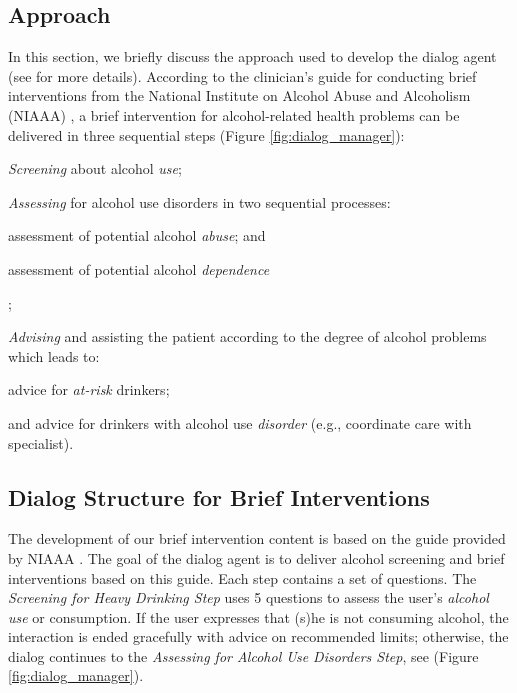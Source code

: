 \documentclass[letterpaper]{article}
\begin{document}
\begin{sloppy}
\section{Approach}

In this section, we briefly discuss the approach used to develop the dialog 
agent (see \cite{YASCLL14} for more details). According to the 
clinician's guide for conducting brief interventions from the National Institute on Alcohol Abuse 
and Alcoholism (NIAAA) \cite{national2007helping}, a brief intervention for alcohol-related health 
problems can be delivered in three sequential steps (Figure 
\ref{fig:dialog_manager}): 
\begin{inparaenum}[1)] 
\item {\em Screening} about alcohol {\em use}; 
\item {\em Assessing} for alcohol use disorders in two sequential processes: 
  \begin{inparaenum}[a)] 
    \item assessment of potential alcohol {\em abuse}; and 
    \item assessment  of potential alcohol {\em dependence}
  \end{inparaenum}; 
\item {\em Advising} and assisting the patient according to the degree of alcohol problems which leads to: 
  \begin{inparaenum} 
    \item advice for {\em at-risk} drinkers; 
    \item and advice for drinkers with alcohol use {\em disorder} (e.g., coordinate care with 
specialist).
  \end{inparaenum} 
\end{inparaenum}

\subsection{Dialog Structure for Brief Interventions}

The development of our brief intervention content is based on the guide provided by 
NIAAA \cite{national2006niaaa}. The goal of the dialog agent is to deliver alcohol screening and 
brief interventions based on this guide. Each step contains a set of questions. The {\em Screening for Heavy Drinking  Step}
uses 5 questions to assess the user's {\em alcohol use} or consumption.  If the user 
expresses that (s)he is not consuming alcohol, the interaction is  ended gracefully with advice on recommended limits; otherwise, the dialog continues to the {\em Assessing for Alcohol Use Disorders Step}, see (Figure \ref{fig:dialog_manager}).


\end{sloppy}
\end{document}
